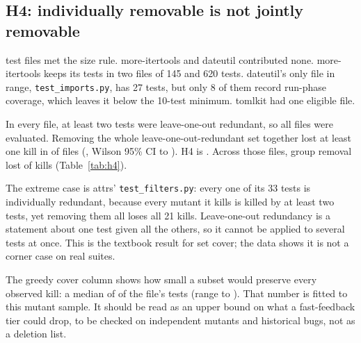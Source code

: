 \subsection{H4: individually removable is not jointly removable}

\HFourUnits{} test files met the size rule. more-itertools and dateutil contributed none. more-itertools keeps its tests in two files of 145 and 620 tests. dateutil's only file in range, \texttt{test\_imports.py}, has 27 tests, but only 8 of them record run-phase coverage, which leaves it below the 10-test minimum. tomlkit had one eligible file.

In every file, at least two tests were leave-one-out redundant, so all \HFourEligible{} files were evaluated. Removing the whole leave-one-out-redundant set together lost at least one kill in \HFourLosing{} of \HFourEligible{} files (\HFourShare{}, Wilson 95\% CI \HFourLo{} to \HFourHi{}). H4 is \textbf{\HFourSupported}. Across those files, group removal lost \HFourLostTotal{} of \HFourKilledTotal{} kills (Table~\ref{tab:h4}).

The extreme case is attrs' \texttt{test\_filters.py}: every one of its 33 tests is individually redundant, because every mutant it kills is killed by at least two tests, yet removing them all loses all 21 kills. Leave-one-out redundancy is a statement about one test given all the others, so it cannot be applied to several tests at once. This is the textbook result for set cover; the data shows it is not a corner case on real suites.

The greedy cover column shows how small a subset would preserve every observed kill: a median of \HFourCoverMedian{} of the file's tests (range \HFourCoverMin{} to \HFourCoverMax{}). That number is fitted to this mutant sample. It should be read as an upper bound on what a fast-feedback tier could drop, to be checked on independent mutants and historical bugs, not as a deletion list.


